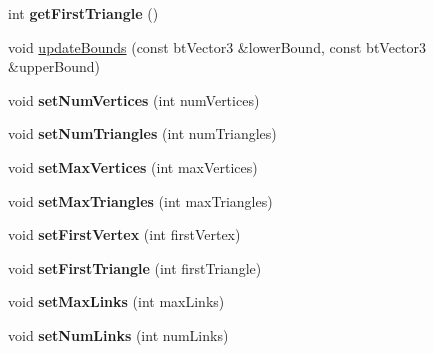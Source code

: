 \begin{DoxyCompactItemize}
int {\bfseries get\+First\+Triangle} ()
\item 
void \hyperlink{classbtOpenCLAcceleratedSoftBodyInterface_a4ffffc49b4b4c0512de11a8884154fe9}{update\+Bounds} (const bt\+Vector3 \&lower\+Bound, const bt\+Vector3 \&upper\+Bound)
\item 
\mbox{\label{classbtOpenCLAcceleratedSoftBodyInterface_a1c2237dd7df117883a24eae0ee961e3c}} 
void {\bfseries set\+Num\+Vertices} (int num\+Vertices)
\item 
\mbox{\label{classbtOpenCLAcceleratedSoftBodyInterface_a0bb6a3d67947c7c45e8b83111e7c647a}} 
void {\bfseries set\+Num\+Triangles} (int num\+Triangles)
\item 
\mbox{\label{classbtOpenCLAcceleratedSoftBodyInterface_ae073f9d4b4458684e74bb5c4c671da3a}} 
void {\bfseries set\+Max\+Vertices} (int max\+Vertices)
\item 
\mbox{\label{classbtOpenCLAcceleratedSoftBodyInterface_aea6a3be6da313903b5490948c6fa9440}} 
void {\bfseries set\+Max\+Triangles} (int max\+Triangles)
\item 
\mbox{\label{classbtOpenCLAcceleratedSoftBodyInterface_aaa25a64fc424d829758a45fdab302bc3}} 
void {\bfseries set\+First\+Vertex} (int first\+Vertex)
\item 
\mbox{\label{classbtOpenCLAcceleratedSoftBodyInterface_a3347af6cf179b898e5b2e8b118e84fe8}} 
void {\bfseries set\+First\+Triangle} (int first\+Triangle)
\item 
\mbox{\label{classbtOpenCLAcceleratedSoftBodyInterface_a9e63de61f9a9f8f60031a03d9291d1f4}} 
void {\bfseries set\+Max\+Links} (int max\+Links)
\item 
\mbox{\label{classbtOpenCLAcceleratedSoftBodyInterface_a4c21506cbe3f6b96372490020b3d6442}} 
void {\bfseries set\+Num\+Links} (int num\+Links)
\item 
\mbox{\label{classbtOpenCLAcceleratedSoftBodyInterface_af1a0c44555525f86945edfa661418865}} 

\end{DoxyCompactItemize}
